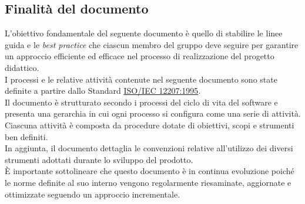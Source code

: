 \subsection{Finalità del documento}
L'obiettivo fondamentale del seguente documento è quello di stabilire le linee guida e le \textit{best practice} che ciascun membro del gruppo deve seguire per garantire un approccio efficiente ed efficace nel processo di realizzazione del progetto didattico.\\
I processi e le relative attività contenute nel seguente documento sono state definite a partire dallo Standard \href{https://www.math.unipd.it/~tullio/IS-1/2009/Approfondimenti/ISO_12207-1995.pdf}{ISO/IEC 12207:1995}.\\
Il documento è strutturato secondo i processi del ciclo di vita del software e presenta una gerarchia in cui ogni processo si configura come una serie di attività. Ciascuna attività è composta da procedure dotate di obiettivi, scopi e strumenti ben definiti.\\
In aggiunta, il documento dettaglia le convenzioni relative all'utilizzo dei diversi strumenti adottati durante lo sviluppo del prodotto.\\
È importante sottolineare che questo documento è in continua evoluzione poiché le norme definite al suo interno vengono regolarmente riesaminate, aggiornate e ottimizzate seguendo un approccio incrementale.\\

